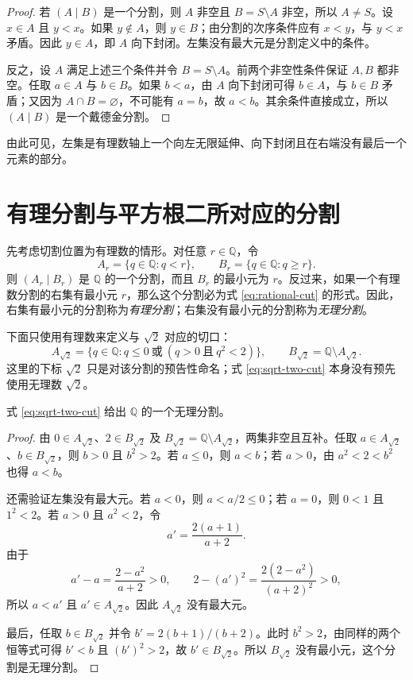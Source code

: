 \documentclass[UTF8,12pt,a4paper,fontset=fandol]{ctexbook}
\begin{document}
\begin{proof}
若 $(A\mid B)$ 是一个分割，则 $A$ 非空且 $B=S\setminus A$ 非空，所以 $A\ne S$。设 $x\in A$ 且 $y<x$。如果 $y\notin A$，则 $y\in B$；由分割的次序条件应有 $x<y$，与 $y<x$ 矛盾。因此 $y\in A$，即 $A$ 向下封闭。左集没有最大元是分割定义中的条件。

反之，设 $A$ 满足上述三个条件并令 $B=S\setminus A$。前两个非空性条件保证 $A,B$ 都非空。任取 $a\in A$ 与 $b\in B$。如果 $b<a$，由 $A$ 向下封闭可得 $b\in A$，与 $b\in B$ 矛盾；又因为 $A\cap B=\varnothing$，不可能有 $a=b$，故 $a<b$。其余条件直接成立，所以 $(A\mid B)$ 是一个戴德金分割。
\end{proof}

由此可见，左集是有理数轴上一个向左无限延伸、向下封闭且在右端没有最后一个元素的部分。

\section{有理分割与平方根二所对应的分割}

先考虑切割位置为有理数的情形。对任意 $r\in\mathbb{Q}$，令
\begin{equation}\label{eq:rational-cut}
  A_r=\{q\in\mathbb{Q}:q<r\},\qquad
  B_r=\{q\in\mathbb{Q}:q\ge r\}.
\end{equation}
则 $(A_r\mid B_r)$ 是 $\mathbb{Q}$ 的一个分割，而且 $B_r$ 的最小元为 $r$。反过来，如果一个有理数分割的右集有最小元 $r$，那么这个分割必为式 \eqref{eq:rational-cut} 的形式。因此，右集有最小元的分割称为\emph{有理分割}；右集没有最小元的分割称为\emph{无理分割}。

下面只使用有理数来定义与 $\sqrt{2}$ 对应的切口：
\begin{equation}\label{eq:sqrt-two-cut}
  A_{\sqrt{2}}
  =\{q\in\mathbb{Q}:q\le 0\ \text{或}\ (q>0\ \text{且}\ q^2<2)\},
  \qquad
  B_{\sqrt{2}}=\mathbb{Q}\setminus A_{\sqrt{2}}.
\end{equation}
这里的下标 $\sqrt{2}$ 只是对该分割的预告性命名；式 \eqref{eq:sqrt-two-cut} 本身没有预先使用无理数 $\sqrt{2}$。

\begin{proposition}
式 \eqref{eq:sqrt-two-cut} 给出 $\mathbb{Q}$ 的一个无理分割。
\end{proposition}

\begin{proof}
由 $0\in A_{\sqrt{2}}$、$2\in B_{\sqrt{2}}$ 及 $B_{\sqrt{2}}=\mathbb{Q}\setminus A_{\sqrt{2}}$，两集非空且互补。任取 $a\in A_{\sqrt{2}}$、$b\in B_{\sqrt{2}}$，则 $b>0$ 且 $b^2>2$。若 $a\le 0$，则 $a<b$；若 $a>0$，由 $a^2<2<b^2$ 也得 $a<b$。

还需验证左集没有最大元。若 $a<0$，则 $a<a/2\le 0$；若 $a=0$，则 $0<1$ 且 $1^2<2$。若 $a>0$ 且 $a^2<2$，令
\[
  a'=\frac{2(a+1)}{a+2}.
\]
由于
\[
  a'-a=\frac{2-a^2}{a+2}>0,
  \qquad
  2-(a')^2=\frac{2(2-a^2)}{(a+2)^2}>0,
\]
所以 $a<a'$ 且 $a'\in A_{\sqrt{2}}$。因此 $A_{\sqrt{2}}$ 没有最大元。

最后，任取 $b\in B_{\sqrt{2}}$ 并令 $b'=2(b+1)/(b+2)$。此时 $b^2>2$，由同样的两个恒等式可得 $b'<b$ 且 $(b')^2>2$，故 $b'\in B_{\sqrt{2}}$。所以 $B_{\sqrt{2}}$ 没有最小元，这个分割是无理分割。
\end{proof}
\end{document}
